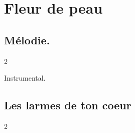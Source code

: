 \documentclass{article}
\newenvironment{album}[1]%
{%
  \section*{#1}
}%
{%
}
\newenvironment{song}[1]%
{%
  \subsection*{\textbf{#1}}
  \begin{multicols*}{2}
}%
{%
  \end{multicols*}
  \newpage
}
\begin{document}
\begin{album}{Fleur de peau}


\begin{song}{Mélodie.}
  Instrumental.
\end{song}


\begin{song}{Les larmes de ton coeur}


\end{song}
\end{album}
\end{document}
